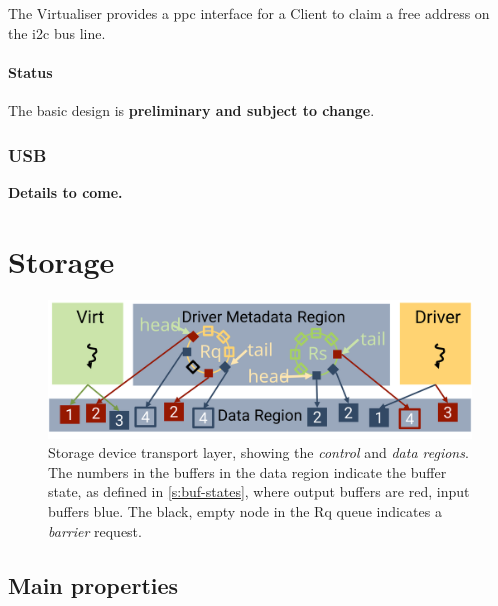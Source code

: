 \documentclass[a4paper,12pt]{report}
\newcommand{\ToCome}[1]{\textbf{#1 to come.}}
\newcommand{\Obj}[1]{\textsl{#1}}
\newcommand{\figscale}{0.2}
\begin{document}
The Virtualiser provides a \gls{ppc} interface for a Client to claim
a free address on the \gls{i2c} bus line.

\paragraph{Status}

The basic design is \textbf{preliminary and subject to change}.

\subsubsection{USB}\label{s:cl-usb}

\ToCome{Details}

\section{Storage}\label{s:cl-storage}

\begin{figure}[th]
  \centering
  \includegraphics[scale=\figscale]{metadata-storage}
  \caption[Storage device transport layer.]{Storage device transport layer, showing the
    \Obj{control} and \Obj{data regions}. The numbers in the
    buffers in the data region indicate the buffer state, as defined
    in \autoref{s:buf-states}, where output
    buffers are red, input buffers blue. The black, empty node in the
    Rq queue indicates a \emph{barrier} request.}
  \label{f:control-storage}
\end{figure}

\subsection{Main properties}\label{s:cl-storage-props}
\end{document}
